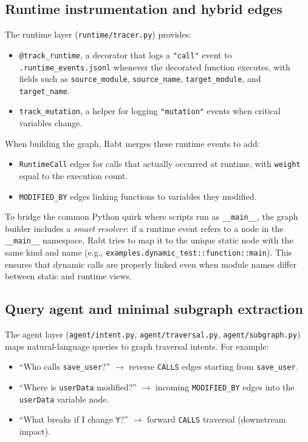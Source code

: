 \documentclass[11pt]{article}
\begin{document}
\subsection{Runtime instrumentation and hybrid edges}

The runtime layer (\texttt{runtime/tracer.py}) provides:
\begin{itemize}
  \item \texttt{@track\_runtime}, a decorator that logs a \texttt{"call"} event to \texttt{.runtime\_events.jsonl} whenever the decorated function executes, with fields such as \texttt{source\_module}, \texttt{source\_name}, \texttt{target\_module}, and \texttt{target\_name}.
  \item \texttt{track\_mutation}, a helper for logging \texttt{"mutation"} events when critical variables change.
\end{itemize}

When building the graph, Rabt merges these runtime events to add:
\begin{itemize}
  \item \texttt{RuntimeCall} edges for calls that actually occurred at runtime, with \texttt{weight} equal to the execution count.
  \item \texttt{MODIFIED\_BY} edges linking functions to variables they modified.
\end{itemize}

To bridge the common Python quirk where scripts run as \texttt{\_\_main\_\_}, the graph builder includes a \emph{smart resolver}: if a runtime event refers to a node in the \texttt{\_\_main\_\_} namespace, Rabt tries to map it to the unique static node with the same kind and name (e.g., \texttt{examples.dynamic\_test::function::main}).
This ensures that dynamic calls are properly linked even when module names differ between static and runtime views.

\subsection{Query agent and minimal subgraph extraction}

The agent layer (\texttt{agent/intent.py}, \texttt{agent/traversal.py}, \texttt{agent/subgraph.py}) maps natural-language queries to graph traversal intents.
For example:
\begin{itemize}
  \item ``Who calls \texttt{save\_user}?'' $\rightarrow$ reverse \texttt{CALLS} edges starting from \texttt{save\_user}.
  \item ``Where is \texttt{userData} modified?'' $\rightarrow$ incoming \texttt{MODIFIED\_BY} edges into the \texttt{userData} variable node.
  \item ``What breaks if I change \texttt{Y}?'' $\rightarrow$ forward \texttt{CALLS} traversal (downstream impact).
\end{itemize}
\end{document}
